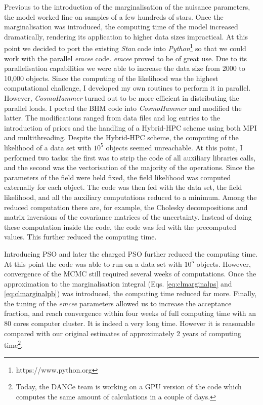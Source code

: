 Previous to the introduction of the marginalisation of the nuisance parameters, the model worked fine on samples of a few hundreds of stars. Once the marginalisation was introduced, the computing time of the model increased dramatically, rendering its application to higher data sizes impractical. At this point we decided to port the existing \emph{Stan} code into \emph
{Python}\footnote{https://www.python.org} so that we could work with the parallel \emph{emcee} code. \emph{emcee} proved to be of great use. Due to its parallelisation capabilities we were able to increase the data size from 2000 to 10,000 objects. Since the computing of the likelihood was the highest computational challenge, I developed my own routines to perform it in parallel. However, \emph{CosmoHammer} \citep{Akeret2013} turned out to be more efficient in distributing the parallel loads. I ported the BHM code into \emph{CosmoHammer} and modified the latter. The modifications ranged from data files and log entries to the introduction of priors and the handling of a Hybrid-HPC scheme using both MPI and multithreading. Despite the Hybrid-HPC scheme, the computing of the likelihood of a data set with $10^5$ objects seemed unreachable. At this point, I performed two tasks: the first was to strip the code of all auxiliary libraries calls, and the second was the vectorisation of the majority of the operations. Since the parameters of the field were held fixed, the field likelihood was computed externally for each object. The code was then fed with the data set, the field likelihood, and all the auxiliary computations reduced to a minimum. Among the reduced computation there are, for example, the Cholesky decompositions and matrix inversions of the covariance matrices of the uncertainty. Instead of doing these computation inside the code, the code was fed with the precomputed values. This further reduced the computing time.

Introducing PSO and later the charged PSO further reduced the computing time.  At this point the code was able to run on a data set with $10^5$ objects. However, convergence of the MCMC still required several weeks of computations. Once the approximation to the marginalisation integral (Eqs. \ref{eq:clmarginalps} and \ref{eq:clmarginalpb}) was introduced, the computing time reduced far more. Finally, the tuning of the \emph{emcee} parameters allowed us to increase the acceptance fraction, and reach convergence within four weeks of full computing time with an 80 cores computer cluster. It is indeed a very long time. However it is reasonable compared with our original estimates of approximately 2 years of computing time\footnote{Today, the DANCe team is working on a GPU version of the code which computes the same amount of calculations in a couple of days.}.

